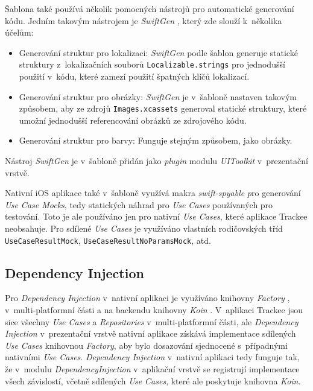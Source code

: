 Šablona také používá několik pomocných nástrojů pro automatické generování kódu. Jedním takovým nástrojem je \emph{SwiftGen} \cite{swiftgen}, který zde slouží k~několika účelům:
\begin{itemize}
\item Generování struktur pro lokalizaci: \emph{SwiftGen} podle šablon generuje statické struktury z~lokalizačních souborů \texttt{Localizable.strings} pro jednodušší použití v~kódu, které zamezí použití špatných klíčů lokalizací.
\item Generování struktur pro obrázky: \emph{SwiftGen} je v~šabloně nastaven takovým způsobem, aby ze zdrojů \texttt{Images.xcassets} generoval statické struktury, které umožní jednodušší referencování obrázků ze zdrojového kódu.
\item Generování struktur pro barvy: Funguje stejným způsobem, jako obrázky.
\end{itemize}
Nástroj \emph{SwiftGen} je v~šabloně přidán jako \emph{plugin} modulu \emph{UIToolkit} v~prezentační vrstvě.

Nativní iOS aplikace také v~šabloně využívá makra \emph{swift-spyable} \cite{swift-spyable} \emph pro generování \emph{Use Case Mocks}, tedy statických náhrad pro \emph{Use Cases} používaných pro testování. Toto je ale používáno jen pro nativní \emph{Use Cases}, které aplikace Trackee neobsahuje. Pro sdílené \emph{Use Cases} je využíváno vlastních rodičovských tříd \texttt{UseCaseResultMock}, \texttt{UseCaseResultNoParamsMock}, atd.

\subsection{Dependency Injection}

Pro \emph{Dependency Injection} v~nativní aplikaci je využíváno knihovny \emph{Factory} \cite{factory}, v~multi-platformní části a na backendu knihovny \emph{Koin} \cite{koin}. V~aplikaci Trackee jsou sice všechny \emph{Use Cases} a \emph{Repositories} v~multi-platformní části, ale \emph{Dependency Injection} v~prezentační vrstvě nativní aplikace získává implementace sdílených \emph{Use Cases} knihovnou \emph{Factory}, aby bylo dosazování sjednocené s~případnými nativními \emph{Use Cases}. \emph{Dependency Injection} v~nativní aplikaci tedy funguje tak, že v~modulu \emph{DependencyInjection} v~aplikační vrstvě se registrují implementace všech závislostí, včetně sdílených \emph{Use Cases}, které ale poskytuje knihovna \emph{Koin}.

